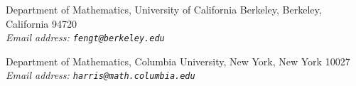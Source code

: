 \medskip
\begin{center}
\begin{minipage}{\linewidth}
\centering
{\small Department of Mathematics, University of California Berkeley, Berkeley, California 94720\\[0.3em]
\itshape Email address: \texttt{fengt@berkeley.edu}}

\medskip
{\small Department of Mathematics, Columbia University, New York, New York 10027\\[0.3em]
\itshape Email address: \texttt{harris@math.columbia.edu}}
\end{minipage}
\end{center}
